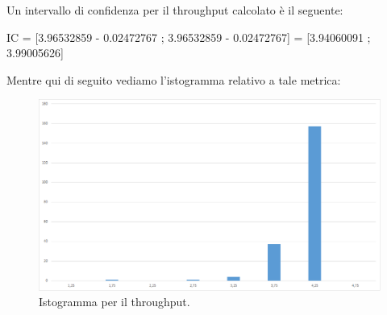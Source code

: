 Un intervallo di confidenza per il throughput calcolato è il seguente:

\begin{center} IC = [3.96532859 - 0.02472767 ; 3.96532859 - 0.02472767] =  [3.94060091 ; 3.99005626]\end{center}

Mentre qui di seguito vediamo l'istogramma relativo a tale metrica:
\begin{figure}[H]
	\begin{center}
	\includegraphics[scale=0.4]{img/histogram.png}
	\caption[Istogramma per il throughput]{Istogramma per il throughput.}
	\label{fig:exp_t_sess}
	\end{center}
\end{figure}

